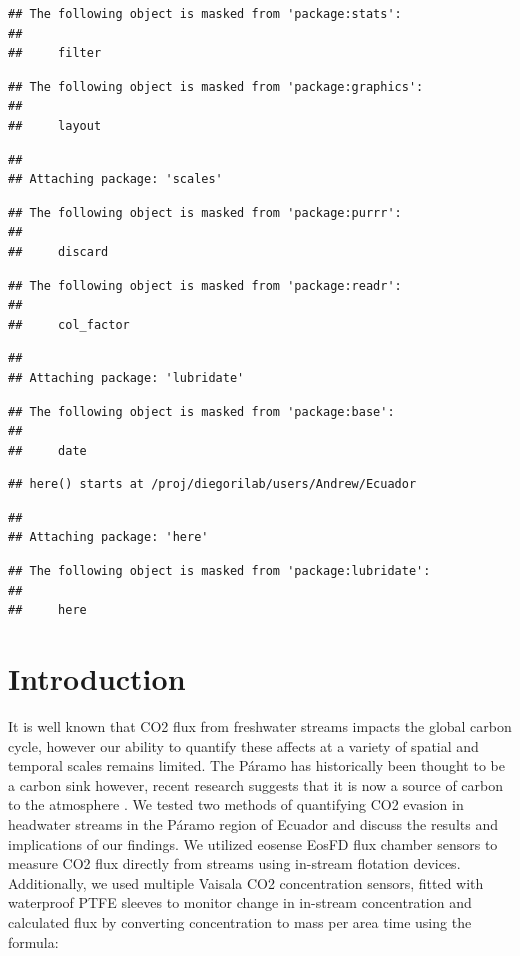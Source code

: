 \documentclass[draft,linenumbers]{agujournal2018}
\begin{document}
\begin{verbatim}
## The following object is masked from 'package:stats':
## 
##     filter
\end{verbatim}

\begin{verbatim}
## The following object is masked from 'package:graphics':
## 
##     layout
\end{verbatim}

\begin{verbatim}
## 
## Attaching package: 'scales'
\end{verbatim}

\begin{verbatim}
## The following object is masked from 'package:purrr':
## 
##     discard
\end{verbatim}

\begin{verbatim}
## The following object is masked from 'package:readr':
## 
##     col_factor
\end{verbatim}

\begin{verbatim}
## 
## Attaching package: 'lubridate'
\end{verbatim}

\begin{verbatim}
## The following object is masked from 'package:base':
## 
##     date
\end{verbatim}

\begin{verbatim}
## here() starts at /proj/diegorilab/users/Andrew/Ecuador
\end{verbatim}

\begin{verbatim}
## 
## Attaching package: 'here'
\end{verbatim}

\begin{verbatim}
## The following object is masked from 'package:lubridate':
## 
##     here
\end{verbatim}

\section{Introduction}

It is well known that CO2 flux from freshwater streams impacts the
global carbon cycle, however our ability to quantify these affects at a
variety of spatial and temporal scales remains limited. The Páramo has
historically been thought to be a carbon sink however, recent research
suggests that it is now a source of carbon to the atmosphere
\citep{carrillo2019breathing}. We tested two methods of quantifying CO2
evasion in headwater streams in the Páramo region of Ecuador and discuss
the results and implications of our findings. We utilized eosense EosFD
flux chamber sensors to measure CO2 flux directly from streams using
in-stream flotation devices. Additionally, we used multiple Vaisala CO2
concentration sensors, fitted with waterproof PTFE sleeves to monitor
change in in-stream concentration and calculated flux by converting
concentration to mass per area time using the formula:
\end{document}
